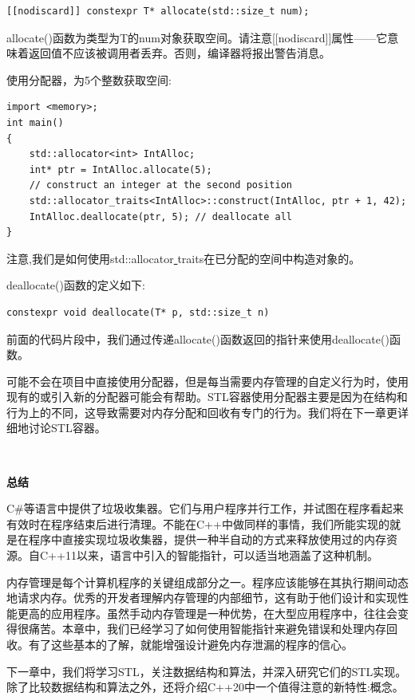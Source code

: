 \begin{lstlisting}[caption={}]
[[nodiscard]] constexpr T* allocate(std::size_t num);
\end{lstlisting}

allocate()函数为类型为T的num对象获取空间。请注意[[nodiscard]]属性——它意味着返回值不应该被调用者丢弃。否则，编译器将报出警告消息。 \par
使用分配器，为5个整数获取空间: \par

\begin{lstlisting}[caption={}]
import <memory>;
int main()
{
	std::allocator<int> IntAlloc;
	int* ptr = IntAlloc.allocate(5);
	// construct an integer at the second position
	std::allocator_traits<IntAlloc>::construct(IntAlloc, ptr + 1, 42);
	IntAlloc.deallocate(ptr, 5); // deallocate all
}
\end{lstlisting}

注意,我们是如何使用std::allocator\underline{ }traits在已分配的空间中构造对象的。 \par
deallocate()函数的定义如下: \par

\begin{lstlisting}[caption={}]
constexpr void deallocate(T* p, std::size_t n)
\end{lstlisting}

前面的代码片段中，我们通过传递allocate()函数返回的指针来使用deallocate()函数。\par
可能不会在项目中直接使用分配器，但是每当需要内存管理的自定义行为时，使用现有的或引入新的分配器可能会有帮助。STL容器使用分配器主要是因为在结构和行为上的不同，这导致需要对内存分配和回收有专门的行为。我们将在下一章更详细地讨论STL容器。 \par

\noindent\textbf{}\ \par
\textbf{总结} \ \par
C\#等语言中提供了垃圾收集器。它们与用户程序并行工作，并试图在程序看起来有效时在程序结束后进行清理。不能在C++中做同样的事情，我们所能实现的就是在程序中直接实现垃圾收集器，提供一种半自动的方式来释放使用过的内存资源。自C++11以来，语言中引入的智能指针，可以适当地涵盖了这种机制。 \par
内存管理是每个计算机程序的关键组成部分之一。程序应该能够在其执行期间动态地请求内存。优秀的开发者理解内存管理的内部细节，这有助于他们设计和实现性能更高的应用程序。虽然手动内存管理是一种优势，在大型应用程序中，往往会变得很痛苦。本章中，我们已经学习了如何使用智能指针来避免错误和处理内存回收。有了这些基本的了解，就能增强设计避免内存泄漏的程序的信心。 \par
下一章中，我们将学习STL，关注数据结构和算法，并深入研究它们的STL实现。除了比较数据结构和算法之外，还将介绍C++20中一个值得注意的新特性:概念。 \par

